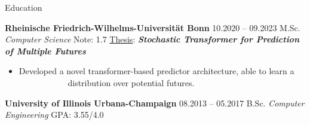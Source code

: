 \begin{rubric}{Education}


\entry*[]  \textbf{Rheinische Friedrich-Wilhelms-Universität Bonn} \hfill  10.2020 -- 09.2023   \newline
 M.Sc. \emph{Computer Science}  \hfill Note:  1.7 \newline
 \underline{Thesis}:  \hspace*{5mm} \textit{\textbf{Stochastic Transformer for Prediction of Multiple Futures}} \newline 
 \vspace{\CVItemizeHeaderSpacing} \begin{itemize}[rightmargin=1cm]
 	\setlength{\itemsep}{\CVItemizeSpacing}
 	\item Developed a novel transformer-based predictor architecture, able to learn a ~~~~~~~~~~~ distribution over potential futures.  
 \end{itemize}
\entry*[]  \textbf{University of Illinois Urbana-Champaign} \hfill  08.2013 -- 05.2017 \newline
B.Sc. \emph{Computer Engineering} \hfill GPA: 3.55/4.0 \newline %



\end{rubric}